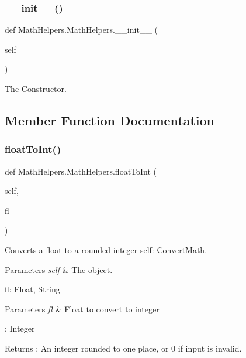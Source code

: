 \subsubsection{\texorpdfstring{\+\_\+\+\_\+init\+\_\+\+\_\+()}{\_\_init\_\_()}}
{\footnotesize\ttfamily def Math\+Helpers.\+Math\+Helpers.\+\_\+\+\_\+init\+\_\+\+\_\+ (\begin{DoxyParamCaption}\item[{}]{self }\end{DoxyParamCaption})}



The Constructor. 



\subsection{Member Function Documentation}
\mbox{\label{classMathHelpers_1_1MathHelpers_aaa4d8aa93fcaac303e9dbf5c1fcf48ff}} 
\subsubsection{\texorpdfstring{float\+To\+Int()}{floatToInt()}}
{\footnotesize\ttfamily def Math\+Helpers.\+Math\+Helpers.\+float\+To\+Int (\begin{DoxyParamCaption}\item[{}]{self,  }\item[{}]{fl }\end{DoxyParamCaption})}



Converts a float to a rounded integer  self\+: Convert\+Math. 


\begin{DoxyParams}{Parameters}
{\em self} & The object.\\
\hline
\end{DoxyParams}
fl\+: Float, String 
\begin{DoxyParams}{Parameters}
{\em fl} & Float to convert to integer\\
\hline
\end{DoxyParams}
\+: Integer \begin{DoxyReturn}{Returns}
\+: An integer rounded to one place, or 0 if input is invalid. 
\end{DoxyReturn}
\mbox{\label{classMathHelpers_1_1MathHelpers_af5f757396b1002192b5808f56a00d473}} 
